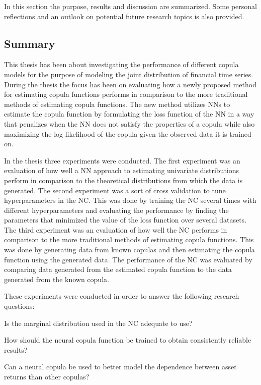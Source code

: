 In this section the purpose, results and discussion are summarized. Some personal reflections and an outlook on potential future research topics is also provided. 

\subsection{Summary}
This thesis has been about investigating the performance of different copula models for the purpose of modeling the joint distribution of financial time series. During the thesis the focus has been on evaluating how a newly proposed  method for estimating copula functions performs in comparison to the more traditional methods of estimating copula functions. The new method utilizes \gls{NN}s to estimate the copula function by formulating the loss function of the \gls{NN} in a way that penalizes when the \gls{NN} does not satisfy the properties of a copula while also maximizing the log likelihood of the copula given the observed data it is trained on. 

In the thesis three experiments were conducted. The first experiment was an evaluation of how well a \gls{NN} approach to estimating univariate distributions perform in comparison to the theoretical distributions from which the data is generated. The second experiment was a sort of cross validation to tune hyperparameters in the \gls{NC}. This was done by training the \gls{NC} several times with different hyperparameters and evaluating the performance by finding the parameters that minimized the value of the loss function over several datasets. The third experiment was an evaluation of how well the \gls{NC} performs in comparison to the more traditional methods of estimating copula functions. This was done by generating data from known copulas and then estimating the copula function using the generated data. The performance of the \gls{NC} was evaluated by comparing data generated from the estimated copula function to the data generated from the known copula.  

These experiments were conducted in order to answer the following research questions:
\begin{compactenum}[{\bfseries RQ}1]
    \item \label{item:RQ1} Is the marginal distribution used in the \gls{NC} adequate to use?
    \item \label{item:RQ2} How should the neural copula function be trained to obtain consistently reliable results?
    \item \label{item:RQ3} Can a neural copula be used to better model the dependence between asset returns than other copulas?
\end{compactenum}

